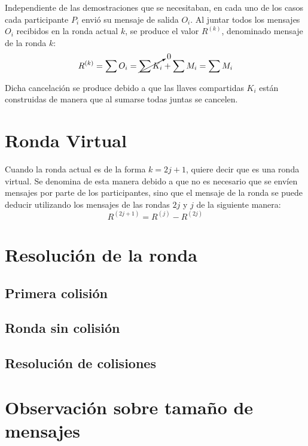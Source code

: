 Independiente de las demostraciones que se necesitaban, en cada uno de los casos cada participante $P_i$ envió su mensaje de salida $O_i$. Al juntar todos los mensajes $O_i$ recibidos en la ronda actual $k$, se produce el valor $R^{(k)}$, denominado mensaje de la ronda $k$: $$R^{(k)} = \sum O_i = \cancelto{0}{\sum K_i} + \sum M_i = \sum M_i$$

Dicha cancelación se produce debido a que las llaves compartidas $K_i$ están construidas de manera que al sumarse todas juntas se cancelen.

\section{Ronda Virtual}

Cuando la ronda actual es de la forma $k = 2j + 1$, quiere decir que es una ronda virtual. Se denomina de esta manera debido a que no es necesario que se envíen mensajes por parte de los participantes, sino que el mensaje de la ronda se puede deducir utilizando los mensajes de las rondas $2j$ y $j$ de la siguiente manera: $$R^{(2j + 1)} = R^{(j)} - R^{(2j)}$$


\section{Resolución de la ronda}
\subsection{Primera colisión}
\subsection{Ronda sin colisión}
\subsection{Resolución de colisiones}
\section{Observación sobre tamaño de mensajes}
